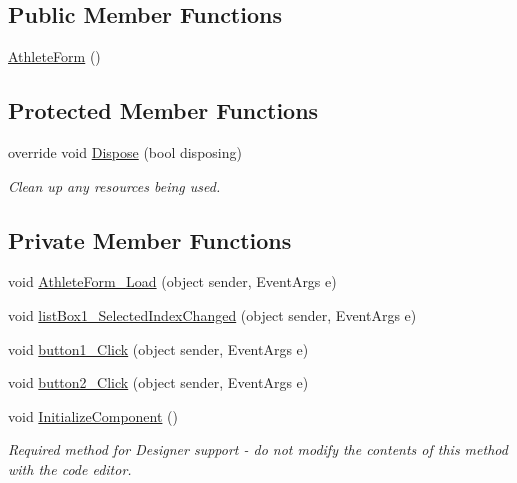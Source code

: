 \subsection*{Public Member Functions}
\begin{DoxyCompactItemize}
\item 
\hyperlink{classProject__Codename__Olympia__v1_1_1__0_1_1AthleteForm_a00727747bf1d1c9b228a5b0d371155bb}{Athlete\+Form} ()
\end{DoxyCompactItemize}
\subsection*{Protected Member Functions}
\begin{DoxyCompactItemize}
\item 
override void \hyperlink{classProject__Codename__Olympia__v1_1_1__0_1_1AthleteForm_a96cf7be874bb0c7f6e0a0a4039cc19eb}{Dispose} (bool disposing)
\begin{DoxyCompactList}\small\item\em Clean up any resources being used. \end{DoxyCompactList}\end{DoxyCompactItemize}
\subsection*{Private Member Functions}
\begin{DoxyCompactItemize}
\item 
void \hyperlink{classProject__Codename__Olympia__v1_1_1__0_1_1AthleteForm_a15306244dd5dae66d16eed50f11494f0}{Athlete\+Form\+\_\+\+Load} (object sender, Event\+Args e)
\item 
void \hyperlink{classProject__Codename__Olympia__v1_1_1__0_1_1AthleteForm_aa34d1d9e34f95eaac79ea029265582b8}{list\+Box1\+\_\+\+Selected\+Index\+Changed} (object sender, Event\+Args e)
\item 
void \hyperlink{classProject__Codename__Olympia__v1_1_1__0_1_1AthleteForm_a9780bfde283c1d4c7a71507b3c1a7179}{button1\+\_\+\+Click} (object sender, Event\+Args e)
\item 
void \hyperlink{classProject__Codename__Olympia__v1_1_1__0_1_1AthleteForm_a61361c2604127856771ed89faccc676b}{button2\+\_\+\+Click} (object sender, Event\+Args e)
\item 
void \hyperlink{classProject__Codename__Olympia__v1_1_1__0_1_1AthleteForm_af91be78be1329f107a3887a2085d3d65}{Initialize\+Component} ()
\begin{DoxyCompactList}\small\item\em Required method for Designer support -\/ do not modify the contents of this method with the code editor. \end{DoxyCompactList}\end{DoxyCompactItemize}
